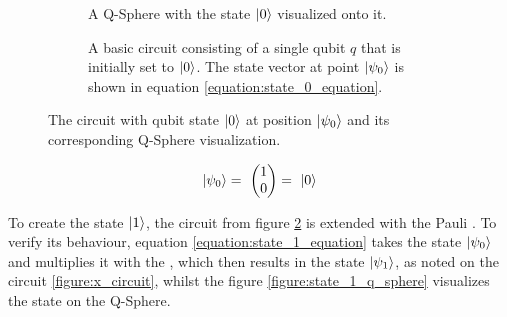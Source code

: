 \begin{figure}[!h]
    \begin{subfigure}{.5\textwidth}
    \centering
        \scalebox{\qspherewidth}{
            
        }
        \caption{A Q-Sphere with the state $\ket{0}$ visualized onto it.}
        \label{figure:state_0_q_sphere}
    \end{subfigure}
    \begin{subfigure}{.5\textwidth}
    \centering
        \caption{A basic circuit consisting of a single qubit $q$ that is initially set to $\ket{0}$. The state vector at point $\ket{\psi_0}$ is shown in equation \ref{equation:state_0_equation}.}
        \label{figure:state_0_circuit}
    \end{subfigure}
    \caption{The circuit with qubit state $\ket{0}$ at position $\ket{\psi_0}$ and its corresponding Q-Sphere visualization.}
    \label{fig:showcase_qubit_state_0_with_circuit}
\end{figure}



\begin{equation}
    \centering
    \begin{split}
        \ket{\psi_0} =\ \begin{pmatrix}1 \\ 0\end{pmatrix} =\ \ket{0}\\
    \end{split}
    \label{equation:state_0_equation}
\end{equation}

\newpage
To create the state $\ket{1}$, the circuit from figure \ref{figure:state_0_circuit} is extended with the Pauli \xgate\cite{qiskit_xgate_nodate}. To verify its behaviour, equation \ref{equation:state_1_equation} takes the state $\ket{\psi_0}$ and multiplies it with the \xgate, which then results in the state $\ket{\psi_1}$, as noted on the circuit \ref{figure:x_circuit}, whilst the figure \ref{figure:state_1_q_sphere} visualizes the state on the Q-Sphere.

